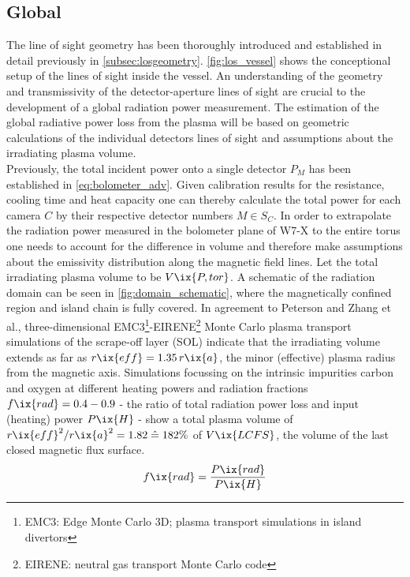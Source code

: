         \subsection{Global}\label{subsec:global}
%
            The line of sight geometry has been thoroughly introduced and established in detail previously in \cref{subsec:losgeometry}. \autoref{fig:los_vessel} shows the conceptional setup of the lines of sight inside the vessel. An understanding of the geometry and transmissivity of the detector-aperture lines of sight are crucial to the development of a global radiation power measurement. The estimation of the global radiative power loss from the plasma will be based on geometric calculations of the individual detectors lines of sight and assumptions about the irradiating plasma volume.\\%
            Previously, the total incident power onto a single detector $P_{M}$ has been established in \cref{eq:bolometer_adv}. Given calibration results for the resistance, cooling time and heat capacity one can thereby calculate the total power for each camera $C$ by their respective detector numbers $M\in S_{C}$. In order to extrapolate the radiation power measured in the bolometer plane of W7-X to the entire torus one needs to account for the difference in volume and therefore make assumptions about the emissivity distribution along the magnetic field lines. Let the total irradiating plasma volume to be $V\ix{P, tor}$. A schematic of the radiation domain can be seen in \cref{fig:domain_schematic}, where the magnetically confined region and island chain is fully covered. In agreement to Peterson and Zhang et al.\cite{Peterson2016_EPS,Zhang2013}, three-dimensional EMC3\footnote[1]{EMC3: Edge Monte Carlo 3D; plasma transport simulations in island divertors}-EIRENE\footnote[2]{EIRENE: neutral gas transport Monte Carlo code} Monte Carlo plasma transport simulations of the scrape-off layer (SOL)\cite{Feng1997,Reiter2005} indicate that the irradiating volume extends as far as $r\ix{eff}=1.35\,r\ix{a}$, the minor (effective) plasma radius from the magnetic axis. Simulations focussing on the intrinsic impurities carbon and oxygen at different heating powers and radiation fractions $f\ix{rad}=0.4-0.9$ - the ratio of total radiation power loss and input (heating) power $P\ix{H}$ - show a total plasma volume of $r\ix{eff}^{2}/r\ix{a}^{2}=1.82\mathrel{\hat{=}}182\%$ of $V\ix{LCFS}$, the volume of the last closed magnetic flux surface.%
%
            \begin{align}%
                f\ix{rad}=\frac{P\ix{rad}}{P\ix{H}}\label{eq:fraction}%
            \end{align}%
